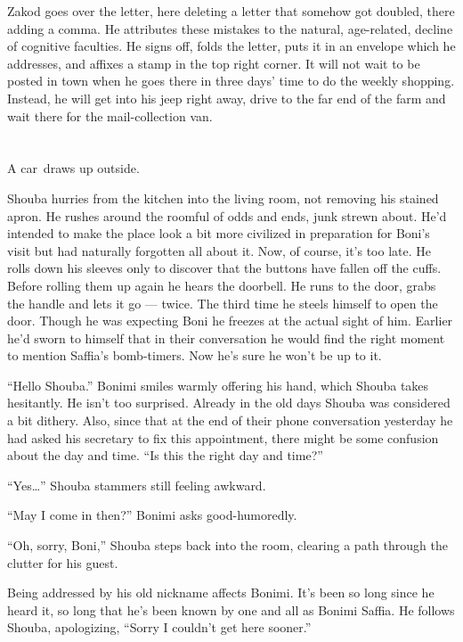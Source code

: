 \documentclass[twoside,11pt,openany]{book}
\begin{document}
Zakod goes over the letter, here deleting a letter that somehow got doubled, there adding a comma. He attributes these
mistakes to the natural, age-related, decline of cognitive faculties.  He signs off, folds the letter, puts it in an
envelope which he addresses, and affixes a stamp in the top right corner. It will not wait to be posted in town when he
goes there in three days{'} time to do the weekly shopping. Instead, he will get into his jeep right away, drive to the
far end of the farm and wait there for the mail-collection van.


\chapter{}

A car~draws up outside.

Shouba hurries from the kitchen into the living room, not removing his stained apron. He rushes around the roomful of
odds and ends, junk strewn about. He'd intended to make the place look a bit more civilized in preparation for Boni's
visit but had naturally forgotten all about it. Now, of course, it's too late. He rolls down his sleeves only to
discover that the buttons have fallen off the cuffs. Before rolling them up again he hears the doorbell. He runs to the
door, grabs the handle and lets it go --- twice. The third time he steels himself to open the door. Though he was
expecting Boni he freezes at the actual sight of him. Earlier he'd sworn to himself that in their conversation he
would find the right moment to mention Saffia's bomb-timers. Now he's sure he won't be up to it.

``Hello Shouba.'' Bonimi smiles warmly offering his hand, which Shouba takes hesitantly. He
isn't too surprised. Already in the old days Shouba was considered a bit dithery.  Also, since that at the end of
their phone conversation yesterday he had asked his secretary to fix this appointment, there might be some confusion
about the day and time. ``Is this the right day and time?''

``Yes{\ldots}'' Shouba stammers still feeling awkward.

``May I come in then?'' Bonimi asks good-humoredly.

``Oh, sorry, Boni,'' Shouba steps back into the room, clearing a path through
the clutter for his guest.

Being addressed by his old nickname affects Bonimi. It's been so long since he heard it, so long that he's been known
by{ }one and all as Bonimi Saffia. He follows Shouba, apologizing, ``Sorry I
couldn't get here sooner.''
\end{document}
